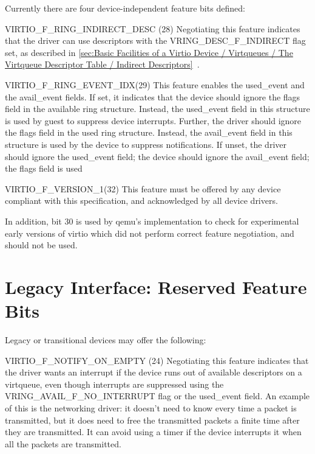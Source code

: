 Currently there are four device-independent feature bits defined:

  VIRTIO_F_RING_INDIRECT_DESC (28) Negotiating this feature indicates
  that the driver can use descriptors with the VRING_DESC_F_INDIRECT
  flag set, as described in \ref{sec:Basic Facilities of a Virtio Device / Virtqueues / The Virtqueue Descriptor Table / Indirect Descriptors}~.

  VIRTIO_F_RING_EVENT_IDX(29) This feature enables the used_event
  and the avail_event fields. If set, it indicates that the
  device should ignore the flags field in the available ring
  structure. Instead, the used_event field in this structure is
  used by guest to suppress device interrupts. Further, the
  driver should ignore the flags field in the used ring
  structure. Instead, the avail_event field in this structure is
  used by the device to suppress notifications. If unset, the
  driver should ignore the used_event field; the device should
  ignore the avail_event field; the flags field is used

  VIRTIO_F_VERSION_1(32) This feature must be offered by any device
  compliant with this specification, and acknowledged by all device
  drivers.

In addition, bit 30 is used by qemu's implementation to check for experimental
early versions of virtio which did not perform correct feature negotiation,
and should not be used.

\section{Legacy Interface: Reserved Feature Bits}\label{sec:Reserved Feature Bits / Legacy Interface: Reserved Feature Bits}

Legacy or transitional devices may offer the following:

VIRTIO_F_NOTIFY_ON_EMPTY (24) Negotiating this feature
  indicates that the driver wants an interrupt if the device runs
  out of available descriptors on a virtqueue, even though
  interrupts are suppressed using the VRING_AVAIL_F_NO_INTERRUPT
  flag or the used_event field. An example of this is the
  networking driver: it doesn't need to know every time a packet
  is transmitted, but it does need to free the transmitted
  packets a finite time after they are transmitted. It can avoid
  using a timer if the device interrupts it when all the packets
  are transmitted.

